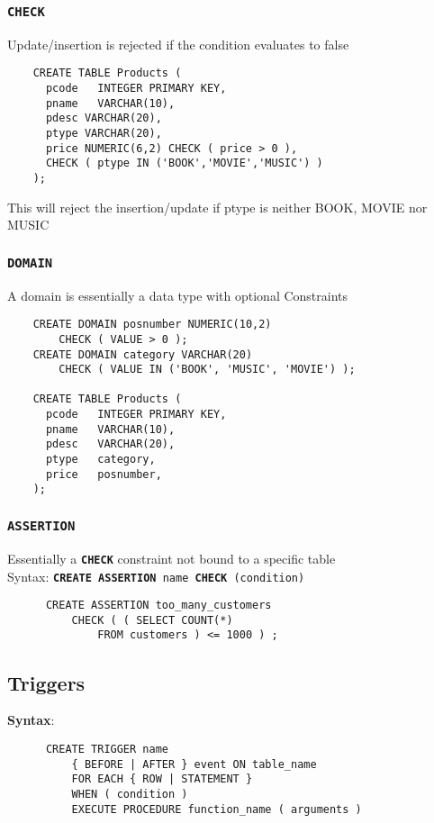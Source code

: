 \documentclass{article}
\begin{document}
\subsubsection*{\texttt{\textbf{CHECK}}}
Update/insertion is rejected if the condition evaluates to false

\begin{lstlisting}
    CREATE TABLE Products (
      pcode   INTEGER PRIMARY KEY,
      pname   VARCHAR(10),
      pdesc VARCHAR(20),
      ptype VARCHAR(20),
      price NUMERIC(6,2) CHECK ( price > 0 ),
      CHECK ( ptype IN ('BOOK','MOVIE','MUSIC') )
    );
  \end{lstlisting}
This will reject the insertion/update if ptype is neither BOOK, MOVIE nor MUSIC

\subsubsection*{\texttt{\textbf{DOMAIN}}}
A domain is essentially a data type with optional Constraints

\begin{lstlisting}
    CREATE DOMAIN posnumber NUMERIC(10,2)
        CHECK ( VALUE > 0 );
    CREATE DOMAIN category VARCHAR(20)
        CHECK ( VALUE IN ('BOOK', 'MUSIC', 'MOVIE') );

    CREATE TABLE Products (
      pcode   INTEGER PRIMARY KEY,
      pname   VARCHAR(10),
      pdesc   VARCHAR(20),
      ptype   category,
      price   posnumber,
    );
  \end{lstlisting}

\subsubsection*{\texttt{\textbf{ASSERTION}}}
Essentially a \texttt{\textbf{CHECK}} constraint not bound to a specific table\\
Syntax: \texttt{\textbf{CREATE ASSERTION} name \textbf{CHECK} (condition)}

\begin{lstlisting}
      CREATE ASSERTION too_many_customers
          CHECK ( ( SELECT COUNT(*)
              FROM customers ) <= 1000 ) ;
    \end{lstlisting}

\subsection{Triggers}
\textbf{Syntax}:
\begin{lstlisting}
      CREATE TRIGGER name
          { BEFORE | AFTER } event ON table_name
          FOR EACH { ROW | STATEMENT }
          WHEN ( condition )
          EXECUTE PROCEDURE function_name ( arguments )
    \end{lstlisting}
\end{document}
